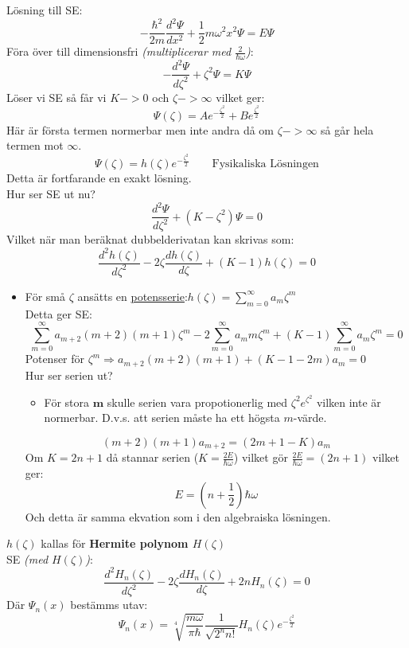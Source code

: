 \documentclass{article}
\begin{document}
    Lösning till SE:
    \[
      -\frac{\hbar^2}{2m}\frac{d^2\Psi}{dx^2}+\frac{1}{2}m\omega^2x^2\Psi=E\Psi
    \]
    Föra över till dimensionsfri \textit{(multiplicerar med $\frac{2}{\hbar\omega}$)}:
    \[
      -\frac{d^2\Psi}{d\zeta^2}+\zeta^2\Psi=K\Psi
    \]
    Löser vi SE så får vi $K->0$ och $\zeta->\infty$ vilket ger:
    \[
      \Psi(\zeta)=Ae^{-\frac{\zeta^2}{2}}+Be^{\frac{\zeta^2}{2}}
    \]
    Här är första termen normerbar men inte andra då om $\zeta->\infty$ så går hela termen mot $\infty$.
    \[
      \Psi(\zeta)=h(\zeta)e^{-\frac{\zeta^2}{2}}\qquad\text{Fysikaliska Lösningen}
    \]
    Detta är fortfarande en exakt lösning.\\

    Hur ser SE ut nu?
    \[
      \frac{d^2\Psi}{d\zeta^2}+(K-\zeta^2)\Psi=0
    \]
    Vilket när man beräknat dubbelderivatan kan skrivas som:
    \[
      \frac{d^2h(\zeta)}{d\zeta^2}-2\zeta\frac{dh(\zeta)}{d\zeta}+(K-1)h(\zeta)=0
    \]
    \begin{itemize}
      \item För små $\zeta$ ansätts en \underline{potensserie}:\quad$h(\zeta)=\sum_{m=0}^{\infty}a_m\zeta^m$\\
      Detta ger SE:
      \[
        \sum_{m=0}^{\infty}a_{m+2}(m+2)(m+1)\zeta^m-2\sum_{m=0}^{\infty}a_mm\zeta^m+(K-1)\sum_{m=0}^{\infty}a_m\zeta^m=0
      \]
      Potenser för $\zeta^m\Rightarrow a_{m+2}(m+2)(m+1)+(K-1-2m)a_m=0$\\

      Hur ser serien ut?
      \begin{itemize}
        \item För stora $\mathbf{m}$ skulle serien vara propotionerlig med $\zeta^2e^{\zeta^2}$ vilken inte är normerbar. D.v.s. att serien måste ha ett högsta $m$-värde.
      \end{itemize}
      \[
        (m+2)(m+1)a_{m+2}=(2m+1-K)a_m
      \]
      Om $K=2n+1$ då stannar serien ($K=\frac{2E}{\hbar\omega}$) vilket gör $\frac{2E}{\hbar\omega}=(2n+1)$ vilket ger:
      \[
        E=(n+\frac{1}{2})\hbar \omega
      \]
      Och detta är samma ekvation som i den algebraiska lösningen.
    \end{itemize}
    $h(\zeta)$ kallas för \textbf{Hermite polynom $H(\zeta)$}\\
    SE \textit{(med $H(\zeta)$)}:
    \[
      \frac{d^2H_n(\zeta)}{d\zeta^2}-2\zeta\frac{dH_n(\zeta)}{d\zeta}+2nH_n(\zeta)=0
    \]
    Där $\Psi_n(x)$ bestämms utav:
    \[
      \Psi_n(x)=\sqrt[4]{\frac{m\omega}{\pi\hbar}}\frac{1}{\sqrt{2^nn!}}H_n(\zeta)e^{-\frac{\zeta^2}{2}}
    \]
\newpage
\end{document}
